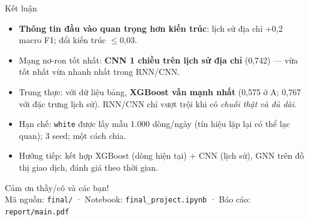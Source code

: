 \documentclass[aspectratio=169,11pt]{beamer}
\newcommand{\code}[1]{\texttt{#1}}
\begin{document}
\begin{frame}{Kết luận}
\begin{itemize}
\item \textbf{Thông tin đầu vào quan trọng hơn kiến trúc}: lịch sử địa chỉ +0,2 macro F1; đổi kiến trúc $\le$0,03.
\item Mạng nơ-ron tốt nhất: \textbf{CNN 1 chiều trên lịch sử địa chỉ} (0,742) --- vừa tốt nhất vừa nhanh nhất trong RNN/CNN.
\item Trung thực: với dữ liệu bảng, \textbf{XGBoost vẫn mạnh nhất} (0,575 ở A; 0,767 với đặc trưng lịch sử).
  RNN/CNN chỉ vượt trội khi có \emph{chuỗi thật và đủ dài}.
\item Hạn chế: \code{white} được lấy mẫu 1.000 dòng/ngày (tín hiệu lặp lại có thể lạc quan); 3 seed; một cách chia.
\item Hướng tiếp: kết hợp XGBoost (dòng hiện tại) + CNN (lịch sử), GNN trên đồ thị giao dịch, đánh giá theo thời gian.
\end{itemize}
\end{frame}

\begin{frame}[standout]
Cảm ơn thầy/cô và các bạn!\\[6pt]
\normalsize Mã nguồn: \code{final/} · Notebook: \code{final\_project.ipynb} · Báo cáo: \code{report/main.pdf}
\end{frame}
\end{document}
